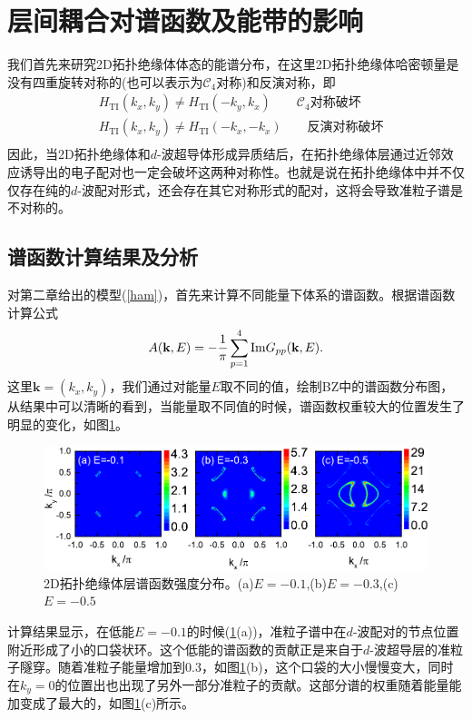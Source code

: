 \section{层间耦合对谱函数及能带的影响}
 我们首先来研究2D拓扑绝缘体体态的能谱分布，在这里2D拓扑绝缘体哈密顿量是没有四重旋转对称的(也可以表示为$\mathcal{C}_4$对称)和反演对称，即
\begin{equation}
\begin{aligned}
&H_{\mathrm{TI}}(k_x,k_y)\neq H_\mathrm{TI}(-k_y,k_x)\qquad \textrm{$\mathcal{C}_4$对称破坏}\\
&H_{\mathrm{TI}}(k_x,k_y)\neq H_\mathrm{TI}(-k_x,-k_x)\qquad\textrm{反演对称破坏}\\
\end{aligned}
\end{equation}
因此，当2D拓扑绝缘体和$d$-波超导体形成异质结后，在拓扑绝缘体层通过近邻效应诱导出的电子配对也一定会破坏这两种对称性。也就是说在拓扑绝缘体中并不仅仅存在纯的$d$-波配对形式，还会存在其它对称形式的配对，这将会导致准粒子谱是不对称的。
\subsection{谱函数计算结果及分析}
 对第二章给出的模型(\ref{ham})，首先来计算不同能量下体系的谱函数。根据谱函数计算公式
\begin{equation}
A({\bf k},E)=-\frac{1}{\pi}\sum^4_{p=1}\mathrm{Im} G_{pp}({\bf k},E).
\end{equation}
这里$\mathbf{k}=(k_x,k_y)$，我们通过对能量$E$取不同的值，绘制BZ中的谱函数分布图，从结果中可以清晰的看到，当能量取不同值的时候，谱函数权重较大的位置发生了明显的变化，如图\ref{fig16}。
\begin{figure}[h]
\centering
\includegraphics[scale=0.9]{pic/fig17.pdf}
\caption{2D拓扑绝缘体层谱函数强度分布。(a)$E=-0.1$,(b)$E=-0.3$,(c)$E=-0.5$}\label{fig16}
\end{figure}
计算结果显示，在低能$E=-0.1$的时候(\ref{fig16}(a))，准粒子谱中在$d$-波配对的节点位置附近形成了小的口袋状环。这个低能的谱函数的贡献正是来自于$d$-波超导层的准粒子隧穿。随着准粒子能量增加到0.3，如图\ref{fig16}(b)，这个口袋的大小慢慢变大，同时在$k_y=0$的位置出也出现了另外一部分准粒子的贡献。这部分谱的权重随着能量能加变成了最大的，如图\ref{fig16}(c)所示。

